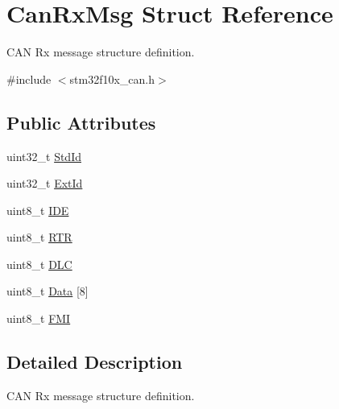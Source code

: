 \hypertarget{structCanRxMsg}{
\section{CanRxMsg Struct Reference}
\label{structCanRxMsg}
}


CAN Rx message structure definition.  




{\ttfamily \#include $<$stm32f10x\_\-can.h$>$}

\subsection*{Public Attributes}
\begin{DoxyCompactItemize}
\item 
uint32\_\-t \hyperlink{structCanRxMsg_a62769e18836146f71238bee6b43b531e}{StdId}
\item 
uint32\_\-t \hyperlink{structCanRxMsg_a1fdca10d31c81eea2ccef41d2aced562}{ExtId}
\item 
uint8\_\-t \hyperlink{structCanRxMsg_a83a67d1a709cc01570ce956e5adc811f}{IDE}
\item 
uint8\_\-t \hyperlink{structCanRxMsg_a9a183149a391a24f86da2ce895f0f1c9}{RTR}
\item 
uint8\_\-t \hyperlink{structCanRxMsg_abf77d3abf9ad290c08cdfd5d99ebc745}{DLC}
\item 
uint8\_\-t \hyperlink{structCanRxMsg_ae8ecbad16622db30d63fda08bc478649}{Data} \mbox{[}8\mbox{]}
\item 
uint8\_\-t \hyperlink{structCanRxMsg_a5afe39d8e295659eeb3030593828b96a}{FMI}
\end{DoxyCompactItemize}


\subsection{Detailed Description}
CAN Rx message structure definition. 

